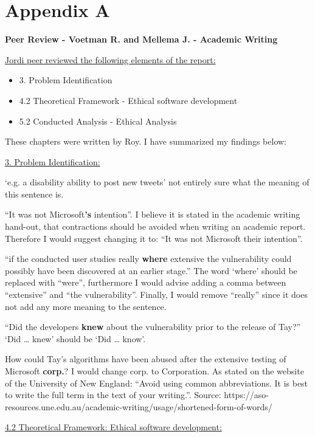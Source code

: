 \chapter*{Appendix A}

\textbf{Peer Review - Voetman R. and Mellema J. - Academic Writing}

\underline{Jordi peer reviewed the following elements of the report:}

\begin{itemize}
    \item 3. Problem Identification
    \item 4.2 Theoretical Framework - Ethical software development
    \item 5.2 Conducted Analysis - Ethical Analysis
\end{itemize}

These chapters were written by Roy. I have summarized my findings below:

\underline{3. Problem Identification:}

‘e.g. a disability ability to post new tweets’ not entirely sure what the meaning of this sentence is.

“It was not Microsoft\textbf{’s} intention”. I believe it is stated in the academic writing hand-out, that contractions should be avoided when writing an academic report. Therefore I would suggest changing it to: “It was not Microsoft their intention”.

“if the conducted user studies really \textbf{where} extensive the vulnerability could possibly have been discovered at an earlier stage.” The word ‘where’ should be replaced with “were”, furthermore I would advise adding a comma between “extensive” and “the vulnerability”. Finally, I would remove “really” since it does not add any more meaning to the sentence.

“Did the developers \textbf{knew} about the vulnerability prior to the release of Tay?”
‘Did … knew’ should be ‘Did … know’.

How could Tay’s algorithms have been abused after the extensive testing of Microsoft \textbf{corp.}? I would change corp. to Corporation. As stated on the website of the University of New England: “Avoid using common abbreviations. It is best to write the full term in the text of your writing.”. Source: https://aso-resources.une.edu.au/academic-writing/usage/shortened-form-of-words/

\underline{4.2 Theoretical Framework: Ethical software development:}

